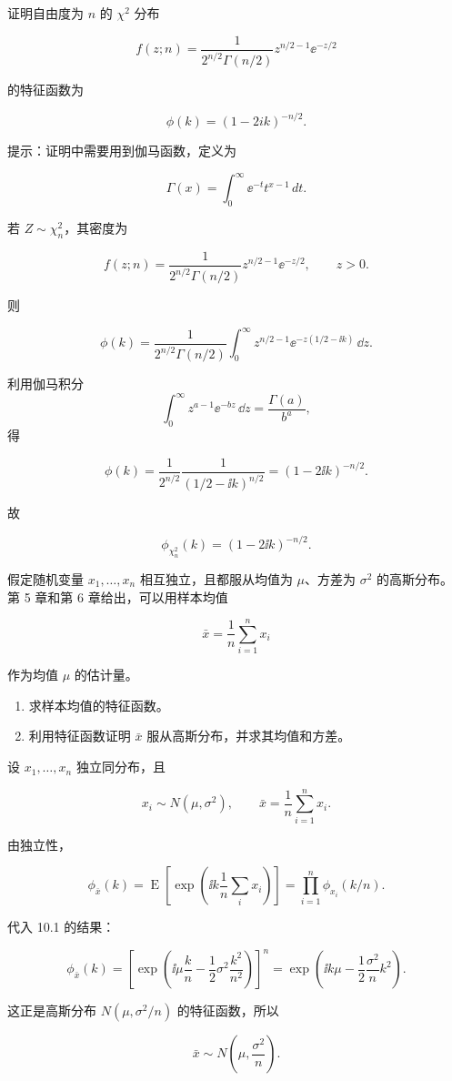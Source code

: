 \begin{question}
证明自由度为 \(n\) 的 \(\chi^2\) 分布

\[
f(z;n)=\frac{1}{2^{n/2}\Gamma(n/2)}z^{n/2-1}\ee^{-z/2}
\]

的特征函数为

\[
\phi(k)=(1-2ik)^{-n/2}.
\]

提示：证明中需要用到伽马函数，定义为

\[
\Gamma(x)=\int_0^\infty \ee^{-t}t^{x-1}\,dt.
\]
\begin{solution}
若 \(Z\sim \chi^2_n\)，其密度为

\[
f(z;n)=\frac{1}{2^{n/2}\Gamma(n/2)}z^{n/2-1}\ee^{-z/2},\qquad z>0.
\]

则

\[
\phi(k)=\frac{1}{2^{n/2}\Gamma(n/2)}
\int_0^\infty z^{n/2-1}\ee^{-z(1/2-\ii k)}\,\dd{z}.
\]

利用伽马积分 \[
\int_0^\infty z^{a-1}\ee^{-bz}\,\dd{z}=\frac{\Gamma(a)}{b^a},
\] 得

\[
\phi(k)=\frac{1}{2^{n/2}}\frac{1}{(1/2-\ii k)^{n/2}}
=(1-2\ii k)^{-n/2}.
\]

故

\[
\phi_{\chi^2_n}(k)=(1-2\ii k)^{-n/2}.
\]
\end{solution}
\end{question}


\begin{question}
假定随机变量 \(x_1,\ldots,x_n\) 相互独立，且都服从均值为 \(\mu\)、方差为
\(\sigma^2\) 的高斯分布。第 5 章和第 6 章给出，可以用样本均值

\[
\bar x=\frac1n\sum_{i=1}^{n}x_i
\]

作为均值 \(\mu\) 的估计量。

\begin{enumerate}
\item 求样本均值的特征函数。

\item 利用特征函数证明 \(\bar x\) 服从高斯分布，并求其均值和方差。
\end{enumerate}
\begin{solution}
设 \(x_1,\dots,x_n\) 独立同分布，且

\[
x_i\sim N(\mu,\sigma^2),\qquad \bar x=\frac1n\sum_{i=1}^n x_i.
\]

由独立性，

\[
\phi_{\bar x}(k)
=\operatorname{E}\!\left[\exp\!\left(\ii k\frac1n\sum_i x_i\right)\right]
=\prod_{i=1}^n \phi_{x_i}(k/n).
\]

代入 10.1 的结果：

\[
\phi_{\bar x}(k)
=\left[\exp\!\left(\ii\mu\frac{k}{n}-\frac12\sigma^2\frac{k^2}{n^2}\right)\right]^n
=\exp\!\left(\ii k\mu-\frac12\frac{\sigma^2}{n}k^2\right).
\]

这正是高斯分布 \(N(\mu,\sigma^2/n)\) 的特征函数，所以

\[
\bar x\sim N\!\left(\mu,\frac{\sigma^2}{n}\right).
\]
\end{solution}
\end{question}


